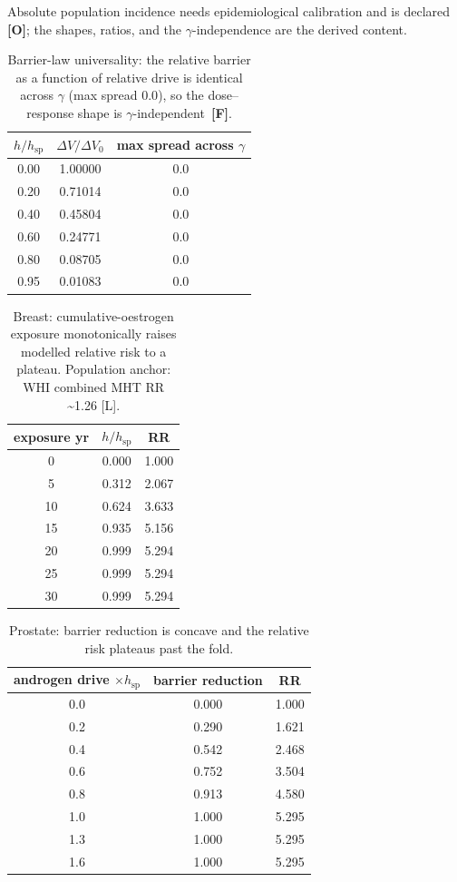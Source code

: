 \documentclass[11pt]{article}
\newcommand{\gradeF}{\textcolor{forced}{\textbf{[F]}}}
\newcommand{\gradeO}{\textcolor{open}{\textbf{[O]}}}
\begin{document}
Absolute population incidence needs epidemiological calibration and is declared \gradeO{}; the shapes,
ratios, and the $\gamma$-independence are the derived content.

\begin{table}[H]
\centering
\small
\caption{Barrier-law universality: the relative barrier as a function of relative drive is identical across $\gamma$ (max spread $0.0$), so the dose--response shape is $\gamma$-independent~\gradeF{}.}
\label{tab:uni}
\begin{tabular}{ccc}
\toprule
$h/h_{\mathrm{sp}}$ & $\Delta V/\Delta V_0$ & max spread across $\gamma$ \\
\midrule
0.00 & 1.00000 & 0.0 \\
0.20 & 0.71014 & 0.0 \\
0.40 & 0.45804 & 0.0 \\
0.60 & 0.24771 & 0.0 \\
0.80 & 0.08705 & 0.0 \\
0.95 & 0.01083 & 0.0 \\
\bottomrule
\end{tabular}
\end{table}

\begin{table}[H]
\centering
\small
\caption{Breast: cumulative-oestrogen exposure monotonically raises modelled relative risk to a plateau. Population anchor: WHI combined MHT RR \textasciitilde{}1.26 [L].}
\label{tab:breast}
\begin{tabular}{ccc}
\toprule
exposure yr & $h/h_{\mathrm{sp}}$ & RR \\
\midrule
0 & 0.000 & 1.000 \\
5 & 0.312 & 2.067 \\
10 & 0.624 & 3.633 \\
15 & 0.935 & 5.156 \\
20 & 0.999 & 5.294 \\
25 & 0.999 & 5.294 \\
30 & 0.999 & 5.294 \\
\bottomrule
\end{tabular}
\end{table}

\begin{table}[H]
\centering
\small
\caption{Prostate: barrier reduction is concave and the relative risk plateaus past the fold.}
\label{tab:prostate}
\begin{tabular}{ccc}
\toprule
androgen drive $\times h_{\mathrm{sp}}$ & barrier reduction & RR \\
\midrule
0.0 & 0.000 & 1.000 \\
0.2 & 0.290 & 1.621 \\
0.4 & 0.542 & 2.468 \\
0.6 & 0.752 & 3.504 \\
0.8 & 0.913 & 4.580 \\
1.0 & 1.000 & 5.295 \\
1.3 & 1.000 & 5.295 \\
1.6 & 1.000 & 5.295 \\
\bottomrule
\end{tabular}
\end{table}
\end{document}
